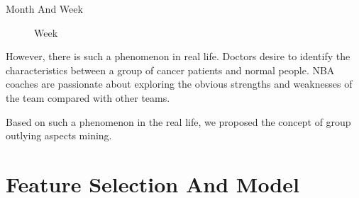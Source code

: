 \documentclass[
 size=12pt,
 paper=smartboard,  %
 mode=present, 		%
 display=slides, 	%
 style=tuliplab,  	%
 pauseslide,
 fleqn,leqno]{powerdot}
\begin{document}
\begin{slide}{Month And Week}
{\begin{figure}
    \caption{Week}
  \end{figure}
  }
\begin{note}
However,
there is such a phenomenon in real life.
Doctors desire to identify the characteristics between
a group of cancer patients and normal people.
NBA coaches are passionate about exploring the obvious strengths and
weaknesses of the team compared with other teams.

Based on such a phenomenon in the real life,
we proposed the concept of group outlying aspects mining.
\end{note}
\end{slide}

\section{Feature Selection And Model}
\end{document}
